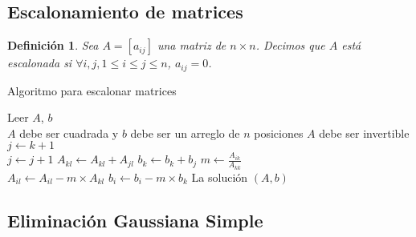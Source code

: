 \documentclass[12pt]{article}
\newtheorem{definition}{Definición}[section]
\begin{document}
        \subsection{Escalonamiento de matrices}
        \begin{definition}
            Sea $A = [a_{ij}]$ una matriz de $n \times n$. Decimos que $A$ está escalonada si $\forall{i,j}, 1\leq i \leq j \leq n$, $a_{ij} = 0$.
        \end{definition}
        \begin{algorithm}[H]
            \caption{Algoritmo para escalonar matrices}
            Leer $A$, $b$ \\
            {$A$ debe ser cuadrada y $b$ debe ser un arreglo de $n$ posiciones}
            {$A$ debe ser invertible}
            \Else
            {
                {
                    {
                        $j \leftarrow k + 1$\\
                        {
                            $j \leftarrow j + 1$
                        }
                        {
                            {
                                $A_{kl} \leftarrow A_{kl} + A_{jl}$
                            }
                            $b_k \leftarrow b_k + b_j$
                        }
                    }
                    {
                        {
                            $m \leftarrow \frac{A_{ik}}{A_{kk}}$\\
                            {
                                $A_{il} \leftarrow A_{il} - m\times A_{kl}$
                            }
                            $b_i \leftarrow b_i - m \times b_k$
                        }
                    }
                }
            }
            La solución $(A, b)$
        \end{algorithm}

        \subsection{Eliminación Gaussiana Simple}
        
\end{document}
